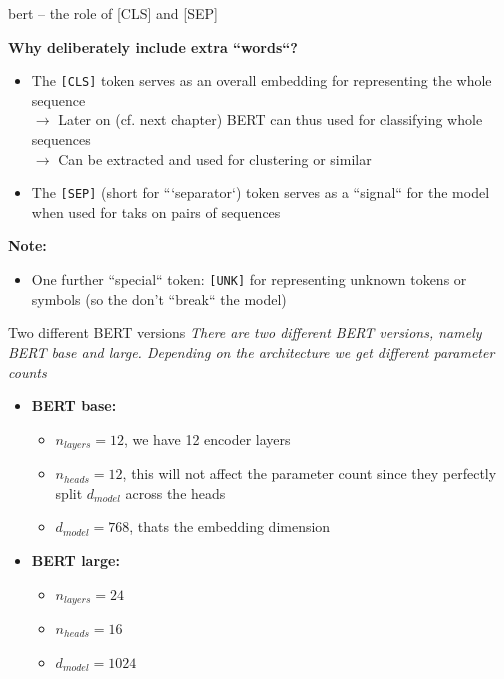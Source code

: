 \documentclass[11pt,compress,t,notes=noshow, xcolor=table]{beamer}
\begin{document}
\begin{frame}{bert -- the role of [CLS] and [SEP]}

\vfill

\textbf{Why deliberately include extra ``words``?}

\begin{itemize}
	\item The \texttt{[CLS]} token serves as an overall embedding for representing the whole sequence\\
				$\to$ Later on (cf. next chapter) BERT can thus used for classifying whole sequences\\
				$\to$ Can be extracted and used for clustering or similar
	\item The \texttt{[SEP]} (short for ```separator`) token serves as a ``signal`` for the model when used for taks on pairs of sequences
\end{itemize}

\textbf{Note:}

\begin{itemize}
	\item One further ``special`` token: \texttt{[UNK]} for representing unknown tokens or symbols (so the don't ``break`` the model)
\end{itemize}

\vfill

\end{frame}


\begin{frame}{Two different BERT versions}
\textit{There are two different BERT versions, namely BERT base and large. Depending on the architecture we get different parameter counts} 

\begin{itemize}
	\item \textbf{BERT base:}
	\begin{itemize}
		\item $n_{layers} = 12$, we have 12 encoder layers
		\item $n_{heads} = 12$, this will not affect the parameter count since they perfectly split $d_{model}$ across the heads
		\item $d_{model} = 768$, thats the embedding dimension
	\end{itemize}

	\item \textbf{BERT large:}
	\begin{itemize}
		\item $n_{layers} = 24$
		\item $n_{heads} = 16$
		\item $d_{model} = 1024$
	\end{itemize}
\end{itemize}
	
\end{frame}
\end{document}
